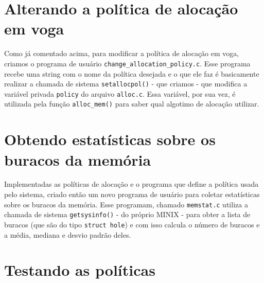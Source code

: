 \documentclass[a4paper, 12pt]{article}
\begin{document}
\section{Alterando a política de alocação em voga}

Como já comentado acima, para modificar a política de alocação em voga, criamos o programa de usuário \texttt{change\_allocation\_policy.c}. Esse programa recebe uma string com o nome da política desejada e o que ele faz é basicamente realizar a chamada de sistema \texttt{setallocpol()} - que criamos - que modifica a variável privada \texttt{policy} do arquivo \texttt{alloc.c}. Essa variável, por sua vez, é utilizada pela função \texttt{alloc\_mem()} para saber qual algotimo de alocação utilizar.


\section{Obtendo estatísticas sobre os buracos da memória}

Implementadas as políticas de alocação e o programa que define a política usada pelo sistema, criado então um novo programa de usuário para coletar estatísticas sobre os buracos da memória. Esse programam, chamado \texttt{memstat.c} utiliza a chamada de sistema \texttt{getsysinfo()} - do próprio MINIX - para obter a lista de buracos (que são do tipo \texttt{struct hole}) e com isso calcula o número de buracos e a média, mediana e desvio padrão deles.

\section{Testando as políticas}

\end{document}
